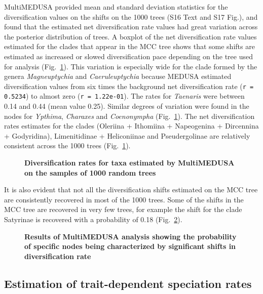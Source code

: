 \documentclass[10pt,letterpaper]{article}
\begin{document}
MultiMEDUSA provided mean and standard deviation statistics for the
diversification values on the shifts on the 1000 trees 
(S16 Text and S17 Fig.), and found that the estimated net diversification rate
values had great variation across the posterior distribution of trees. A
boxplot of the net diversification rate values estimated for the clades
that appear in the MCC tree shows that some shifts are estimated as
increased or slowed diversification pace depending on the tree used for
analysis (Fig.~\ref{fig2}). This variation is especially wide for the clade
formed by the genera \emph{Magneuptychia} and \emph{Caeruleuptychia}
because MEDUSA estimated diversification values from six times the
background net diversification rate (\texttt{r = 0.5234}) to almost zero
(\texttt{r = 1.22e-01}). The rates for \emph{Taenaris} were between 0.14
and 0.44 (mean value 0.25). Similar degrees of variation were found in
the nodes for \emph{Ypthima}, \emph{Charaxes} and \emph{Coenonympha}
(Fig.~\ref{fig2}). The net diversification rates estimates for the clades
(Oleriina + Ithomiina + Napeogenina + Dircennina + Godyridina),
Limenitidinae + Heliconiinae and Pseudergolinae are relatively
consistent across the 1000 trees (Fig.~\ref{fig2}).

\begin{figure}[h]
\caption{{\bf Diversification rates for taxa estimated by MultiMEDUSA on
the samples of 1000 random trees}}
\label{fig2}
\end{figure}

It is also evident that not all the diversification shifts estimated on
the MCC tree are consistently recovered in most of the 1000 trees. Some
of the shifts in the MCC tree are recovered in very few trees, for
example the shift for the clade Satyrinae is recovered with a
probability of 0.18 (Fig.~\ref{fig3}).

\begin{figure}[h]
\caption{{\bf Results of MultiMEDUSA analysis showing the
probability of specific nodes being characterized by significant shifts
in diversification rate}}
\label{fig3}
\end{figure}

\subsection*{Estimation of trait-dependent speciation
rates}
\end{document}
